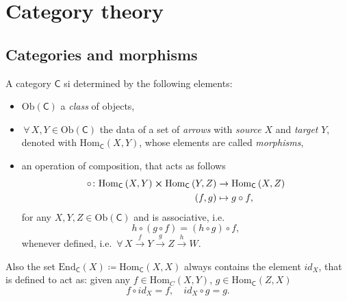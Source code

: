 \section{Category theory}

\subsection{Categories and morphisms}

\begin{defn}[Category]
	A category $\mathsf{C}$ si determined by the following elements:
	\begin{itemize}
		\item $\mathrm{Ob}(\mathsf{C})$ a {\em class} of objects,
		\item $\,\forall\, X,Y \in \mathrm{Ob}(\mathsf{C})$ the data of a set of {\em arrows}  with {\em source} $X$ and {\em target} $Y$, denoted with $\mathrm{Hom}_{\mathsf{C}} \left( X, Y \right)$, whose elements are called {\em morphisms},
		\item an operation of composition, that acts as follows
			\begin{align}
				\circ\colon \mathrm{Hom}_{\mathsf{C}} \left( X, Y \right) \cross \mathrm{Hom}_{\mathsf{C}} \left( Y, Z \right) &\to \mathrm{Hom}_{\mathsf{C}} \left( X, Z \right)\\
				\left(f, g\right) &\mapsto g \circ f
			,\end{align} 
			for any $X,Y,Z \in \mathrm{Ob}(\mathsf{C})$ and is associative, i.e.
			\begin{equation}
				h \circ (g \circ f) = (h \circ g) \circ f
			,\end{equation} 
			whenever defined, i.e. $\,\forall\, X \xrightarrow{f} Y \xrightarrow{g} Z \xrightarrow{h} W$.
	\end{itemize}
	Also the set $\mathrm{End}_{\mathsf{C}}\left(X\right) \coloneqq \mathrm{Hom}_{\mathsf{C}} \left( X, X \right)$ always contains the element $id_X$, that is defined to act as: given any $f \in \mathrm{Hom}_{C} \left( X, Y \right)$, $g \in \mathrm{Hom}_{\mathsf{C}} \left( Z, X \right)$ 
	\begin{equation}
	f \circ id_X = f, \quad id_X \circ g = g
	.\end{equation} 
\end{defn}

